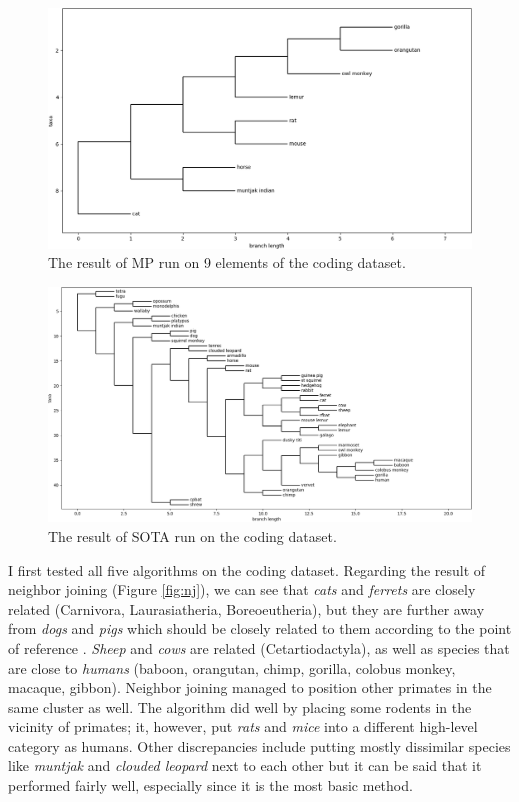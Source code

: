 \documentclass[11pt,twocolumn]{article}
\begin{document}
\begin{figure}
    \centering
    \includegraphics[width=\linewidth]{img/mp_9_taxa.png}
    \caption{The result of MP run on 9 elements of the coding dataset.}
    \label{fig:mp}
\end{figure}

\begin{figure}
    \centering
    \includegraphics[width=\linewidth]{img/sota.png}
    \caption{The result of SOTA run on the coding dataset.}
    \label{fig:sota}
\end{figure}

I first tested all five algorithms on the coding dataset. Regarding the result of neighbor joining (Figure \ref{fig:nj}), we can see that \textit{cats} and \textit{ferrets} are closely related (Carnivora, Laurasiatheria, Boreoeutheria), but they are further away from \textit{dogs} and \textit{pigs} which should be closely related to them according to the point of reference \cite{Prasad2008}. \textit{Sheep} and \textit{cows} are related (Cetartiodactyla), as well as species that are close to \textit{humans} (baboon, orangutan, chimp, gorilla, colobus monkey, macaque, gibbon). Neighbor joining managed to position other primates in the same cluster as well. The algorithm did well by placing some rodents in the vicinity of primates; it, however, put \textit{rats} and \textit{mice} into a different high-level category as humans. Other discrepancies include putting mostly dissimilar species like \textit{muntjak} and \textit{clouded leopard} next to each other but it can be said that it performed fairly well, especially since it is the most basic method.
\end{document}
